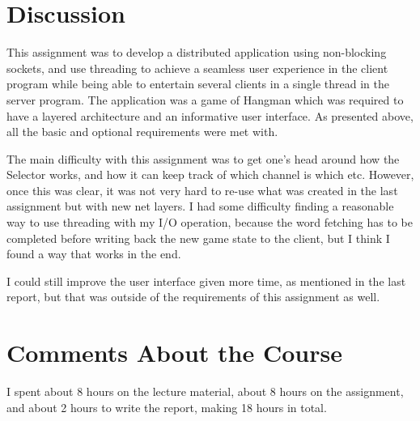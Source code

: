 \documentclass[a4paper]{scrartcl}
\begin{document}
\section{Discussion}

This assignment was to develop a distributed application using non-blocking sockets, and use threading to achieve a seamless user experience in the client program while being able to entertain several clients in a single thread in the server program. The application was a game of Hangman which was required to have a layered architecture and an informative user interface. As presented above, all the basic and optional requirements were met with.

The main difficulty with this assignment was to get one's head around how the Selector works, and how it can keep track of which channel is which etc. However, once this was clear, it was not very hard to re-use what was created in the last assignment but with new net layers. I had some difficulty finding a reasonable way to use threading with my I/O operation, because the word fetching has to be completed before writing back the new game state to the client, but I think I found a way that works in the end.

I could still improve the user interface given more time, as mentioned in the last report, but that was outside of the requirements of this assignment as well.

\section{Comments About the Course}

I spent about 8 hours on the lecture material, about 8 hours on the assignment, and about 2 hours to write the report, making 18 hours in total.
\end{document}
